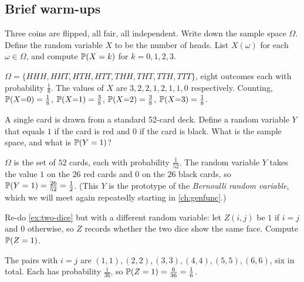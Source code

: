 \subsection*{Brief warm-ups}

\begin{warmup}[\coffee{1}]
Three coins are flipped, all fair, all independent. Write down the sample space $\Omega$. Define the random variable $X$ to be the number of heads. List $X(\omega)$ for each $\omega \in \Omega$, and compute $\mathbb{P}(X = k)$ for $k = 0, 1, 2, 3$.
\end{warmup}
\begin{warmupSolution}
$\Omega = \{HHH, HHT, HTH, HTT, THH, THT, TTH, TTT\}$, eight outcomes each with probability $\tfrac{1}{8}$. The values of $X$ are $3, 2, 2, 1, 2, 1, 1, 0$ respectively. Counting,
$\mathbb{P}(X{=}0) = \tfrac{1}{8}$,
$\mathbb{P}(X{=}1) = \tfrac{3}{8}$,
$\mathbb{P}(X{=}2) = \tfrac{3}{8}$,
$\mathbb{P}(X{=}3) = \tfrac{1}{8}$.
\end{warmupSolution}

\begin{warmup}[\coffee{1}]
A single card is drawn from a standard 52-card deck. Define a random variable $Y$ that equals $1$ if the card is red and $0$ if the card is black. What is the sample space, and what is $\mathbb{P}(Y = 1)$?
\end{warmup}
\begin{warmupSolution}
$\Omega$ is the set of $52$ cards, each with probability $\tfrac{1}{52}$. The random variable $Y$ takes the value $1$ on the $26$ red cards and $0$ on the $26$ black cards, so $\mathbb{P}(Y = 1) = \tfrac{26}{52} = \tfrac{1}{2}$. (This $Y$ is the prototype of the \emph{Bernoulli random variable}, which we will meet again repeatedly starting in \cref{ch:genfunc}.)
\end{warmupSolution}

\begin{warmup}[\coffee{2}]
Re-do \cref{ex:two-dice} but with a different random variable: let $Z(i, j)$ be $1$ if $i = j$ and $0$ otherwise, so $Z$ records whether the two dice show the same face. Compute $\mathbb{P}(Z = 1)$.
\end{warmup}
\begin{warmupSolution}
The pairs with $i = j$ are $(1,1), (2,2), (3,3), (4,4), (5,5), (6,6)$, six in total. Each has probability $\tfrac{1}{36}$, so $\mathbb{P}(Z = 1) = \tfrac{6}{36} = \tfrac{1}{6}$.
\end{warmupSolution}

